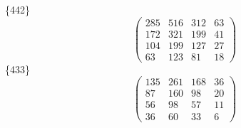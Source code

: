\documentclass[12pt,reqno]{amsart}
\begin{document}
\{442\}                             $$ \begin{pmatrix} 
                       285 & 516 & 312 & 63 \\[6pt]
                       172 & 321 & 199 & 41 \\[6pt]
                       104 & 199 & 127 & 27 \\[6pt]
                          63 & 123 & 81 & 18
                              \end{pmatrix} $$ 
\{433\}                             $$ \begin{pmatrix} 
                       135 & 261 & 168 & 36 \\[6pt]
                        87 & 160 & 98 & 20 \\[6pt]
                         56 & 98 & 57 & 11 \\[6pt]
                           36 & 60 & 33 & 6
                              \end{pmatrix} $$ 
\end{document}
